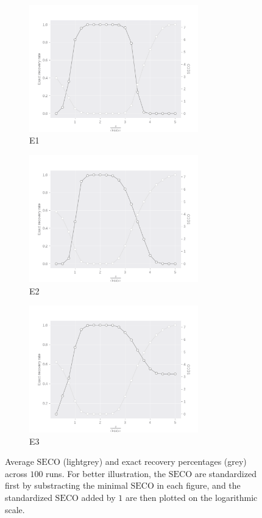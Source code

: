 \documentclass[11pt]{article}
\newcommand{\SECO}{\mathrm{SECO}}
\theoremstyle{definition}
\begin{document}
\begin{figure}[!htp]
                \begin{subfigure}{.33\textwidth}
                  \centering
                  \includegraphics[width=.9\linewidth,height=5.5cm]{figure/model_1CV.pdf}
                  \caption{E1}
                  \label{fig:sfig_cv1}
                \end{subfigure}%
                \begin{subfigure}{.33\textwidth}
                  \centering
                  \includegraphics[width=.9\linewidth,height=5.5cm]{figure/model_2CV.pdf}
                  \caption{E2}
                  \label{fig:sfig_cv2}
                \end{subfigure}
                \begin{subfigure}{.33\textwidth}
                  \centering
                  \includegraphics[width=.9\linewidth,height=5.5cm]{figure/model_3CV.pdf}
                  \caption{E3}
                  \label{fig:sfig_cv3}
                \end{subfigure}%
                \hspace{\fill}
    	\caption{Average $\SECO$ (lightgrey) and exact recovery percentages (grey) across $100$ runs. For better illustration, the $\SECO$ are standardized first by substracting the minimal $\SECO$ in each figure, and the standardized $\SECO$ added by $1$ are then plotted on the logarithmic scale.}
    	\label{fig:cv}
	\end{figure}
	 
\end{document}
